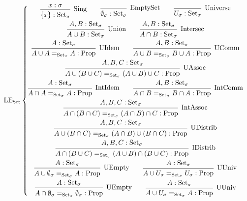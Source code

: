 \documentclass[]{article}
\newcommand{\1}{\mathbbm{1}}
\newcommand{\0}{\mathbbm{0}}
\newcommand{\Prop}{\text{Prop}}
\newcommand{\Set}{\text{Set}}
\newcommand{\proof}[1]{{\scantokens{\begin{prooftree}#1\end{prooftree}}}}
\begin{document}
\[\text{LE}_\text{Set}\left\{
    \begin{gathered}
        \proof{
            \hypo{x:\sigma}
            \infer1[Sing]{\{x\} : \Set_\sigma}
        }
        \qquad\proof{
            \infer0[EmptySet]{\emptyset_\sigma : \Set_\sigma}
        }
        \qquad\proof{
            \infer0[Universe]{U_\sigma : \Set_\sigma}
        }\\
        \proof{
            \hypo{A, B : \Set_\sigma}
            \infer1[Union]{A\cup B : \Set_\sigma}
        }
        \qquad\proof{
            \hypo{A, B : \Set_\sigma}
            \infer1[Intersec]{A\cap B: \Set_\sigma}
        }\\
        \proof{
            \hypo{A : \Set_\sigma}
            \infer1[UIdem]{A\cup A =_{\Set_\sigma} A : \Prop}
        }
        \qquad\proof{
            \hypo{A, B : \Set_\sigma}
            \infer1[UComm]{A\cup B =_{\Set_\sigma} B\cup A : \Prop}
        }\\
        \proof{
            \hypo{A, B, C : \Set_\sigma}
            \infer1[UAssoc]{A\cup (B\cup C) =_{\Set_\sigma} (A\cup B)\cup C : \Prop}
        }\\
        \proof{
            \hypo{A : \Set_\sigma}
            \infer1[IntIdem]{A\cap A =_{\Set_\sigma} A : \Prop}
        }
        \qquad\proof{
            \hypo{A, B : \Set_\sigma}
            \infer1[IntComm]{A\cap B =_{\Set_\sigma} B\cap A : \Prop}
        }\\
        \proof{
            \hypo{A, B, C : \Set_\sigma}
            \infer1[IntAssoc]{A\cap (B\cap C) =_{\Set_\sigma} (A\cap B)\cap C : \Prop}
        }\\
        \proof{
            \hypo{A, B, C : \Set_\sigma}
            \infer1[UDistrib]{A\cup (B\cap C) =_{\Set_\sigma}
                              (A\cap B) \cup (B\cap C) : \Prop}
        }\\
        \proof{
            \hypo{A, B, C : \Set_\sigma}
            \infer1[IDistrib]{A\cap (B\cup C) =_{\Set_\sigma}
                              (A\cup B) \cap (B\cup C) : \Prop}
        }\\
        \proof{
            \hypo{A : \Set_\sigma}
            \infer1[UEmpty]{A\cup \emptyset_\sigma =_{\Set_\sigma} A : \Prop}
        }
        \qquad\proof{
            \hypo{A : \Set_\sigma}
            \infer1[UUniv]{A\cup U_\sigma =_{\Set_\sigma} U_\sigma : \Prop}
        }\\
        \proof{
            \hypo{A : \Set_\sigma}
            \infer1[UEmpty]{A\cap \emptyset_\sigma =_{\Set_\sigma}
                            \emptyset_\sigma : \Prop}
        }
        \qquad\proof{
            \hypo{A : \Set_\sigma}
            \infer1[UUniv]{A\cup U_\sigma =_{\Set_\sigma} A : \Prop}
        }\\
    \end{gathered}
\right.\]
\end{document}
